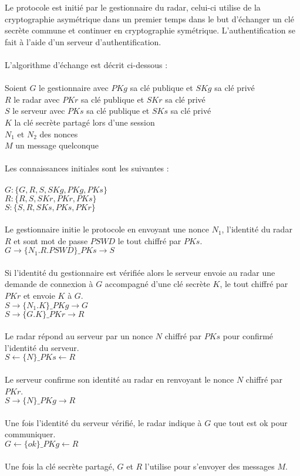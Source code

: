 \documentclass[]{scrartcl}
\begin{document}
Le protocole est initié par le gestionnaire du radar, celui-ci utilise de la cryptographie asymétrique dans un premier temps dans le but d'échanger un clé secrète commune et continuer en cryptographie symétrique. L'authentification se fait à l'aide d'un serveur d'authentification.
\\
\\
L'algorithme d'échange est décrit ci-dessous : 
\\
\\
Soient 
$G$ le gestionnaire avec $PKg$ sa clé publique et  $SKg$ sa clé privé
\\
$R$ le radar avec $PKr$ sa clé publique et  $SKr$ sa clé privé
\\
$S$ le serveur avec $PKs$ sa clé publique et  $SKs$ sa clé privé
\\
$K$ la clé secrète partagé lors d'une session
\\
$N_{1}$ et $N_{2}$ des nonces
\\
$M$ un message quelconque
\\
\\
Les connaissances initiales sont les suivantes :
\\
\\
$G : \{G, R, S, SKg, PKg, PKs\}$
\\
$R : \{R, S, SKr, PKr, PKs\}$
\\
$S : \{S, R, SKs, PKs, PKr\}$
\\
\\
Le gestionnaire initie le protocole en envoyant une nonce $N_{1}$, l'identité du radar $R$ et sont mot de passe $PSWD$ le tout chiffré par $PKs$.
\\
$G \rightarrow \{N_{1}.R.PSWD\}\_PKs \longrightarrow S$
\\
\\
Si l'identité du gestionnaire est vérifiée alors le serveur envoie au radar une demande de connexion à $G$ accompagné d'une clé secrète $K$, le tout chiffré par $PKr$ et envoie $K$ à $G$.
\\
$S \rightarrow \{N_{1}.K\}\_PKg \longrightarrow G$
\\
$S \rightarrow \{G.K\}\_PKr \longrightarrow R$
\\
\\
Le radar répond au serveur par un nonce $N$ chiffré par $PKs$ pour confirmé l'identité du serveur.
\\
$S \longleftarrow \{N\}\_PKs \leftarrow R$
\\
\\
Le serveur confirme son identité au radar en renvoyant le nonce $N$ chiffré par $PKr$.
\\
$S \rightarrow \{N\}\_PKg \longrightarrow R$
\\
\\
Une fois l'identité du serveur vérifié, le radar indique à $G$ que tout est ok pour communiquer.
\\
$G \longleftarrow \{ok\}\_PKg \leftarrow R$
\\
\\
Une fois la clé secrète partagé, $G$ et $R$ l'utilise pour s'envoyer des messages $M$.
\\
\end{document}
